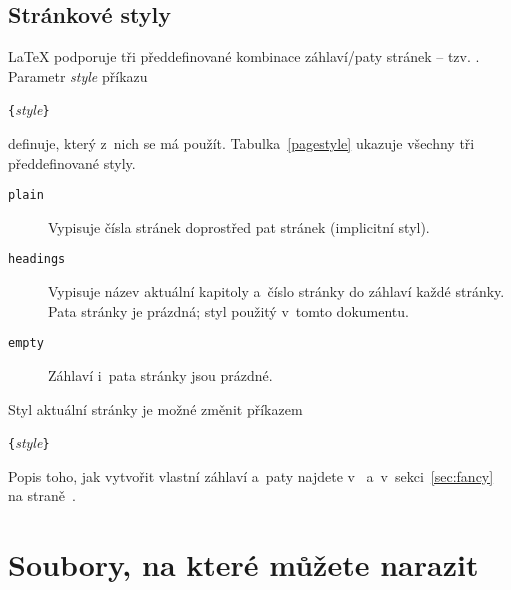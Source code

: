 \subsection{Stránkové styly}
 
\LaTeX{} podporuje tři předdefinované kombinace záhlaví/paty stránek
-- tzv. . Parametr \emph{style} příkazu
\begin{lscommand}
\verb|{|\emph{style}\verb|}|
\end{lscommand}
\noindent definuje, který z~nich se má použít. 
Tabulka~\ref{pagestyle}
ukazuje všechny tři předdefinované styly.

\begin{table}[!hbp]
\caption{Předdefinované stránkové styly \LaTeX u.} \label{pagestyle}
\begin{lined}{\textwidth}
\begin{description}

\item[\normalfont\texttt{plain}] Vypisuje čísla stránek doprostřed
  pat stránek (implicitní styl).

\item[\normalfont\texttt{headings}] Vypisuje název aktuální kapitoly
  a~číslo stránky do záhlaví každé stránky. Pata stránky je prázdná;
  styl použitý v~tomto dokumentu.
\item[\normalfont\texttt{empty}] Záhlaví i~pata stránky jsou prázdné.

\end{description}
\end{lined}
\end{table}

Styl aktuální stránky je možné změnit příkazem
\begin{lscommand}
\verb|{|\emph{style}\verb|}|
\end{lscommand}
Popis toho, jak vytvořit vlastní záhlaví a~paty najdete v~\companion{}
a~v~sekci~\ref{sec:fancy} na straně~\pageref{sec:fancy}.
%
%

\section{Soubory, na které můžete narazit}

